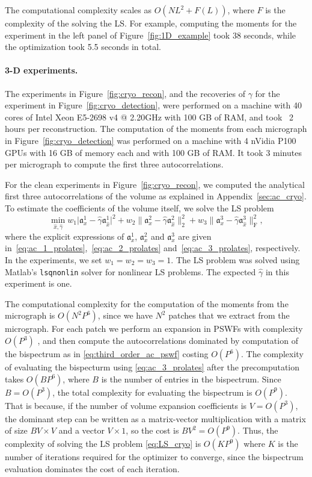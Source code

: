 \documentclass[12pt]{article}
\newcommand{\1}{\mathbf{1}}
\theoremstyle{plain}
\theoremstyle{definition}
\theoremstyle{remark}
\theoremstyle{plain}
\theoremstyle{remark}
\theoremstyle{plain}
\theoremstyle{plain}
\begin{document}
The computational complexity scales as $O(NL^2 + F(L))$, where $F$ is the complexity of the solving the LS.
For example, computing the moments for the experiment in the left panel of Figure~\ref{fig:1D_example} took 38 seconds, while the optimization took 5.5 seconds in total.

\paragraph{3-D experiments.}


The experiments in Figure~\ref{fig:cryo_recon}, and the recoveries of $\gamma$ for the experiment in Figure~\ref{fig:cryo_detection}, were performed on a machine with 40 cores of Intel Xeon E5-2698 v4 @ 2.20GHz with 100 GB of RAM, and took ~2 hours per reconstruction. The computation of the moments from each micrograph in Figure~\ref{fig:cryo_detection} was performed on a machine with 4 nVidia P100 GPUs with 16 GB of memory each and with 100 GB of RAM. It took 3 minutes per micrograph to compute the first three autocorrelations.

For the {clean} experiments in Figure~\ref{fig:cryo_recon}, we computed the analytical first three autocorrelations of the volume as explained in Appendix~\ref{sec:ac_cryo}.
To estimate the coefficients of the volume itself, we solve the LS problem
\begin{equation} \label{eq:LS_cryo}
\min_{\hat{x},\hat{\gamma}} w_1 \vert \mathfrak{a}_x^1 - \hat{\gamma}\mathfrak{a}_{\hat{x}}^1 \vert^2 + w_2\| \mathfrak{a}_x^2 - \hat{\gamma}\mathfrak{a}_{\hat{x}}^2 \|_2^2 + w_3\| \mathfrak{a}_x^3 - \hat{\gamma}\mathfrak{a}_{\hat{x}}^3 \|_\text{F}^2, 
\end{equation}  
where the explicit expressions of $\mathfrak{a}_x^1$, $\mathfrak{a}_x^2$ and $\mathfrak{a}_x^3$ are given in~\eqref{eq:ac_1_prolates},~\eqref{eq:ac_2_prolates} and~\eqref{eq:ac_3_prolates}, respectively.  
In the experiments, we set $w_1=w_2=w_3=1$. 
The LS problem was solved using Matlab's \texttt{lsqnonlin} solver for nonlinear LS problems. The expected $\hat \gamma$ in this experiment is one. 

The computational complexity for the computation of the moments from the micrograph is $O(N^2P^6)$, since we have $N^2$ patches that we extract from the micrograph. For each patch we perform an expansion in PSWFs with complexity $O(P^3)$ \cite{landa2017steerable}, and then compute the autocorrelations dominated by computation of the bispectrum as in \eqref{eq:third_order_ac_pswf} costing $O(P^6)$. The complexity of evaluating the bispecturm using \eqref{eq:ac_3_prolates} after the precomputation takes $O(BP^6)$, where $B$ is the number of entries in the bispectrum. Since $B=O(P^3)$, the total complexity for evaluating the bispectrum is $O(P^9)$. That is because, if the number of volume expansion coefficients is $V = O(P^3)$, the dominant step can be written as a matrix-vector multiplication with a matrix of size $BV\times V$ and a vector $V\times 1$, so the cost is $BV^2=O(P^9)$. Thus, the complexity of solving the LS problem \eqref{eq:LS_cryo} is $O(KP^9)$ where $K$ is the number of iterations required for the optimizer to converge, since the bispectrum evaluation dominates the cost of each iteration.
\end{document}
